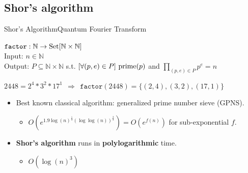\documentclass{beamer}
\newcommand{\mt}[1]{\textnormal{#1}}
\begin{document}
\subsection{Shor's algorithm}

\begin{frame}{Shor's Algorithm}{Quantum Fourier Transform}
	\begin{definition}
		$\texttt{factor} : \mathbb{N} \rightarrow \mt{Set}[\mathbb{N} \times \mathbb{N}]$\\
        	Input: $n \in \mathbb{N}$\\
        	Output: $P \subseteq \mathbb{N} \times \mathbb{N}$ s.t. $[\forall (p,e) \in P]\ \mt{prime}(p)$ and $\prod\limits_{(p,e) \in P} p^e = n$
	\end{definition}
    
    \begin{example}
       $2448 = 2^4 * 3^2 * 17^1\ \ \Rightarrow\ \ 
       \texttt{factor}(2448) = \{(2,4), (3,2), (17,1)\}$
    \end{example}

	\begin{itemize}
		\item Best known classical algorithm: generalized prime number sieve (GPNS).
			\begin{itemize}
				\item $O(e^{1.9 \log(n)^{\frac{1}{3}} (\log\log(n))^{\frac{2}{3}}}) = O(e^{f(n)})$ for sub-exponential $f$.
			\end{itemize}

		\item \textbf{Shor's algorithm} runs in \textbf{polylogarithmic} time.
			\begin{itemize}
				\item $O(\log(n)^3)$
			\end{itemize}
	\end{itemize}
\end{frame}
\end{document}
